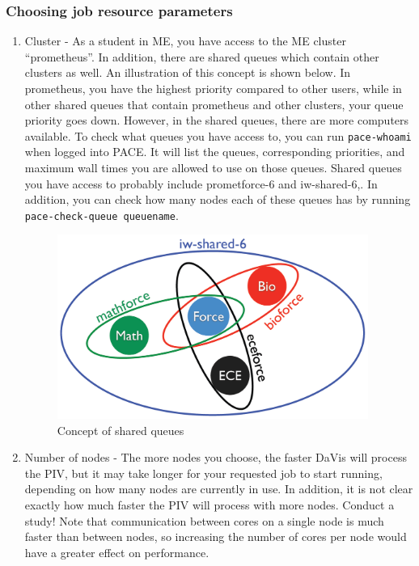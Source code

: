 \documentclass{article}
\newcommand{\quotes}[1]{``#1''}
\begin{document}
	\subsubsection{Choosing job resource parameters}
	\label{jobresources}
	\begin{enumerate}
		\item Cluster - As a student in ME, you have access to the ME cluster \quotes{prometheus}.  In addition, there are shared queues which contain other clusters as well.  An illustration of this concept is shown below.  In prometheus, you have the highest priority compared to other users, while in other shared queues that contain prometheus and other clusters, your queue priority goes down.  However, in the shared queues, there are more computers available.  To check what queues you have access to, you can run \texttt{pace-whoami} when logged into PACE.  It will list the queues, corresponding priorities, and maximum wall times you are allowed to use on those queues.  Shared queues you have access to probably include prometforce-6 and iw-shared-6,.  In addition, you can check how many nodes each of these queues has by running \texttt{pace-check-queue queuename}.
		\begin{figure}[h!]
			\centering
			\includegraphics[width=4in]{./clusters.png} 
			\caption{Concept of shared queues}
		\end{figure}
	
		\item Number of nodes - The more nodes you choose, the faster DaVis will process the PIV, but it may take longer for your requested job to start running, depending on how many nodes are currently in use.  In addition, it is not clear exactly how much faster the PIV will process with more nodes.  Conduct a study!  Note that communication between cores on a single node is much faster than between nodes, so increasing the number of cores per node would have a greater effect on performance.
		

\end{enumerate}
\end{document}
